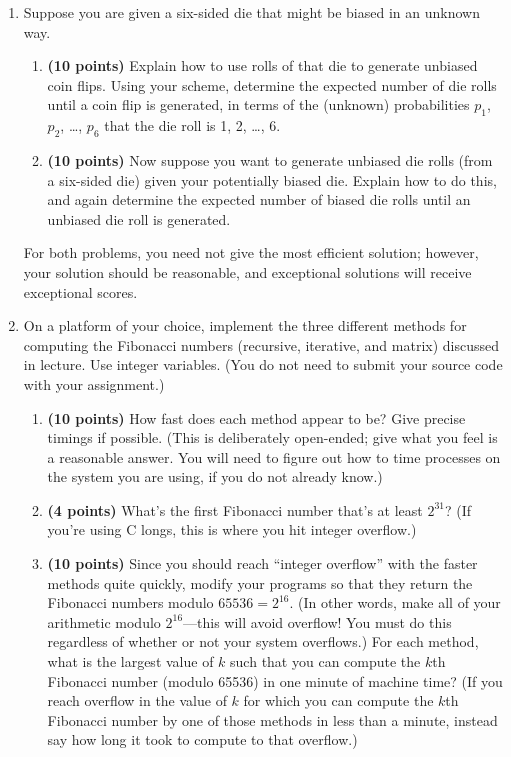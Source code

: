 \documentclass[11pt]{article}
\begin{document}
\begin{enumerate}
\item
Suppose you are given a six-sided die that might be biased in an unknown way. 
\begin{enumerate}
\item
{\bf (10 points)}
Explain how to use rolls of that die to generate unbiased coin flips. Using your scheme, determine
the expected number of die rolls until a coin flip is generated, in terms of the (unknown) probabilities
$p_1$, $p_2$, \ldots, $p_6$ that the die roll is 1, 2, \ldots, 6.
\item 
{\bf (10 points)}
Now suppose you want to generate unbiased die rolls (from a six-sided die) given
your potentially biased die. Explain how to do this, and again determine the expected number of
biased die rolls until an unbiased die roll is generated. 
\end{enumerate}
For both problems, you need not give the
most efficient solution; however, your solution should be reasonable, and exceptional solutions will
receive exceptional scores.
\item
On a platform of your choice, implement the three different methods for computing the Fibonacci
numbers (recursive, iterative, and matrix) discussed in lecture. Use integer variables. (You do not need to submit your source code with your assignment.)
\begin{enumerate}
\item
{\bf (10 points)}
How fast does
each method appear to be? Give precise timings if possible. (This is deliberately open-ended; give
what you feel is a reasonable answer. You will need to figure out how to time processes on the system
you are using, if you do not already know.) 
\item
{\bf (4 points)}
What's the first Fibonacci number that's at least $2^{31}$? (If you're using C longs, this is where you hit
integer overflow.)
\item
{\bf (10 points)}
Since you should reach ``integer overflow'' with the faster methods quite quickly, modify your programs
so that they return the Fibonacci numbers modulo $65536 = 2^{16}$. (In other words, make all of your
arithmetic modulo $2^{16}$---this will avoid overflow! You must do this regardless of whether or not your
system overflows.) For each method, what is the largest value of $k$ such that you can compute the
$k$th Fibonacci number (modulo 65536) in one minute of machine time?
(If you reach overflow in the value of $k$ for which you can compute the $k$th Fibonacci number
by one of those methods in less than a minute, instead say how long it took to compute to that overflow.)
\end{enumerate}


\end{enumerate}
\end{document}
